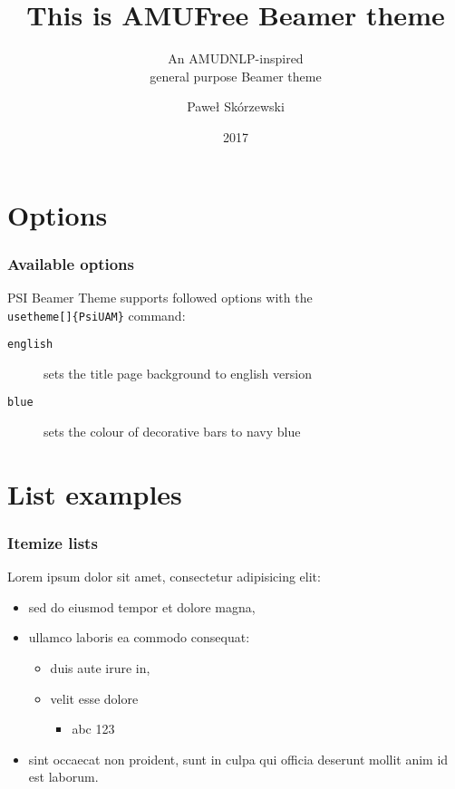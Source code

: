 \documentclass{beamer}
\title{This is AMUFree Beamer theme}
\subtitle{An AMUDNLP-inspired\\general purpose Beamer theme}
\author[{P. Sk{\'o}rzewski}]{Pawe{\l} Sk{\'o}rzewski}
\date{2017}
\begin{document}
\begin{frame}
	\titlepage
\end{frame}


\section{Options}

\begin{frame}
	\frametitle{Available options}
    PSI Beamer Theme supports followed options with the 
    \texttt{\\usetheme[]\{PsiUAM\}} command:
		\begin{description}
 			\item [\texttt{english}] sets the title page background to english version
 			\item [\texttt{blue}] sets the colour of decorative bars to navy blue
 		\end{description}
\end{frame}

\section{List examples}

\begin{frame}

	\frametitle{Itemize lists}
    Lorem ipsum dolor sit amet, consectetur adipisicing elit:
		\begin{itemize}
			\item sed do eiusmod tempor et dolore magna,
      \item ullamco laboris ea commodo consequat:
      \begin{itemize}
        \item duis aute irure in,
        \item velit esse dolore
        \begin{itemize}
          \item abc 123
         \end{itemize}
      \end{itemize}
      \item sint occaecat non proident, sunt in culpa qui officia 
        deserunt mollit anim id est laborum.
		\end{itemize}

\end{frame}
\end{document}
